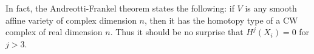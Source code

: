 \begin{remark}
In fact, the Andreotti-Frankel theorem \cite{andreotti_affinecw} states the following: if $V$ is any smooth affine variety of complex dimension $n$, then it has the homotopy type of a CW complex of real dimension $n$. Thus it should be no surprise that $H^j(X_i)=0$ for $j > 3$.
\end{remark}
 